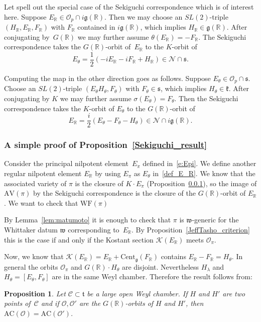 \documentclass[10pt,leqno]{article}
\newtheorem{proposition}[equation]{Proposition}
\renewcommand{\O}{\mathcal O}
\newcommand{\R}{\mathbb R}
\newcommand{\N}{\mathcal N}
\renewcommand{\k}{\mathfrak k}
\renewcommand{\t}{\mathfrak t}
\newcommand{\g}{\mathfrak g}
\newcommand{\s}{\mathfrak s}
\newcommand{\w}{\mathfrak w}
\newcommand{\AV}{\mathrm{AV}}
\newcommand{\WF}{\mathrm{WF}}
\newcommand{\AC}{\mathrm{AC}}
\newcommand{\Op}{\O_p}
\newcommand{\Kostant}[1]{\mathcal{K}(#1)}
\begin{document}
Let spell out the special case of the Sekiguchi correspondence which is of interest here. 
Suppose $E_\R\in \Op\cap i\g(\R)$. Then we may choose an $SL(2)$-triple $(H_\R,E_\R,F_\R)$ with $F_\R$  contained in $i\g(\R)$,
which implies $H_\R\in \g(\R)$. 
After conjugating by~$G(\R)$ we may further assume $\theta(E_\R)=-F_\R$.
The Sekiguchi correspondence takes the $G(\R)$-orbit of~$E_\R$ to the $K$-orbit of
$$
E_\theta=\frac12(-iE_\R-iF_\R+H_\R)\in \N\cap \s.
$$

Computing the map in the other direction goes as follows.
Suppose $E_\theta\in \Op\cap\s$. Choose an $SL(2)$-triple  $(E_\theta H_\theta,F_\theta)$ with
$F_\theta\in\s$, which implies $H_\theta\in\k$. After conjugating by $K$ we may further assume $\sigma(E_\theta)=F_\theta$.
Then the Sekiguchi correspondence takes the $K$-orbit of $E_\theta$ to the $G(\R)$-orbit of 
\begin{equation}\label{def_E_R}
E_\R=\frac i2(E_\theta-F_\theta-H_\theta)\in\N\cap i\g(\R).
\end{equation}

\subsubsection{A simple proof of Proposition~\ref{Sekiguchi_result}}

Consider the principal nilpotent element~$E_\pi$ defined in~\eqref{e:Epi}. We define another regular nilpotent element  $E_\R$ by using $E_\pi$ as $E_\theta$ in~\eqref{def_E_R}. We know that the associated variety of $\pi$ is the closure of $K \cdot E_\pi$ (Proposition~\ref{}), so the image of $\AV(\pi)$ by the Sekiguchi correspondence is the closure of the $G(\R)$-orbit of $E_\R$. We want to check that $\WF(\pi)$ 

By Lemma~\ref{lem:matumoto} it is enough to check that $\pi$ is $\w$-generic for the Whittaker datum $\w$ corresponding to~$E_\R$. By Proposition~\ref{JeffTasho_criterion} this is the case if and only if the Kostant section $\Kostant{E_\R}$ meets $\mathcal{O}_\pi$. 

Now, we know that $\Kostant{E_\R}=E_\R+\mathrm{Cent}_\g(F_\R)$ contains $E_\R-F_\R = H_\theta$. In general the orbits $\mathcal{O}_\pi$ and $G(\R) \cdot H_\theta$ are disjoint. Nevertheless $H_{\lambda}$ and $H_\theta=[E_\theta, F_\theta]$ are in the same Weyl chamber. Therefore the result follows from:  

\begin{proposition}\label{prop:AC_chamber} Let $\mathcal{C} \subset \t$ be a large open Weyl chamber.
If $H$ and $H'$ are two points of~$\mathcal{C}$ and if $\mathcal{O}, \mathcal{O}'$ are the   $G(\R)$-orbits of $H$ and $H'$, then $\AC(\mathcal{O})=\AC(\mathcal{O}')$.
\end{proposition}
\end{document}
